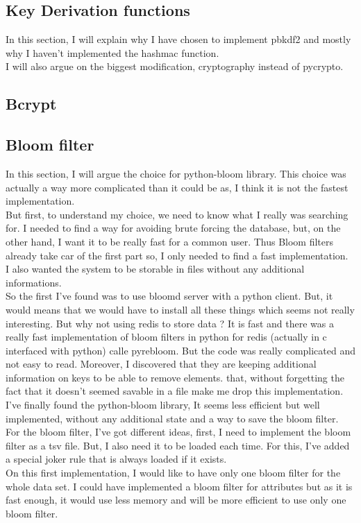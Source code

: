\documentclass{eplmastersthesis}
\begin{document}
\subsection{Key Derivation functions}
In this section, I will explain why I have chosen to implement pbkdf2 and mostly why I haven't implemented the hashmac function.\\
I will also argue on the biggest modification, cryptography instead of pycrypto.

\subsection{Bcrypt}

\subsection{Bloom filter}
In this section, I will argue the choice for python-bloom library. This choice was actually a way more complicated than it could be as, I think it is not the fastest implementation.\\
But first, to understand my choice, we need to know what I really was searching for. I needed to find a way for avoiding brute forcing the database, but, on the other hand, I want it to be really fast for a common user. Thus Bloom filters already take car of the first part so, I only needed to find a fast implementation.\\
I also wanted the system to be storable in files without any additional informations.\\
So the first I've found was to use bloomd server with a python client. But, it would means that we would have to install all these things which seems not really interesting. But why not using redis to store data ? It is fast and there was a really fast implementation of bloom filters in python for redis (actually in c interfaced with python) calle pyrebloom. But the code was really complicated and not easy to read. Moreover, I discovered that they are keeping additional information on keys to be able to remove elements. that, without forgetting the fact that it doesn't seemed savable in a file make me drop this implementation.\\
I've finally found the python-bloom library, It seems less efficient but well implemented, without any additional state and a way to save the bloom filter.\\

For the bloom filter, I've got different ideas, first, I need to implement the bloom filter as a tsv file. But, I also need it to be loaded each time. For this, I've added a special joker rule that is always loaded if it exists.\\
On this first implementation, I would like to have only one bloom filter for the whole data set. I could have implemented a bloom filter for attributes but as it is fast enough, it would use less memory and will be more efficient to use only one bloom filter.\\
\end{document}
